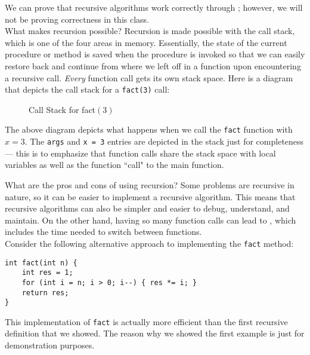 \noindent We can prove that recursive algorithms work correctly through ; however, we will not be proving correctness in this class. \\

\noindent What makes recursion possible? Recursion is made possible with the call stack, which is one of the four areas in memory. Essentially, the state of the current procedure or method is saved when the procedure is invoked so that we can easily restore back and continue from where we left off in a function upon encountering a recursive call. \textit{Every} function call gets its own stack space. Here is a diagram that depicts the call stack for a \verb!fact(3)! call:

\begin{figure}[h]
\centering
{}
\caption{Call Stack for fact$(3)$}
\end{figure}

The above diagram depicts what happens when we call the \verb!fact! function with $x = 3$. The \verb!args! and \verb!x = 3! entries are depicted in the stack just for completeness --- this is to emphasize that function calls share the stack space with local variables as well as the function ``call" to the main function. 

What are the pros and cons of using recursion? Some problems are recursive in nature, so it can be easier to implement a recursive algorithm. This means that recursive algorithms can also be simpler and easier to debug, understand, and maintain. On the other hand, having so many function calls can lead to , which includes the time needed to switch between functions. \\

Consider the following alternative approach to implementing the \verb!fact! method:

\begin{lstlisting}
int fact(int n) {
    int res = 1;
    for (int i = n; i > 0; i--) { res *= i; }
    return res;
}
\end{lstlisting}

This implementation of \verb!fact! is actually more efficient than the first recursive definition that we showed. The reason why we showed the first example is just for demonstration purposes.